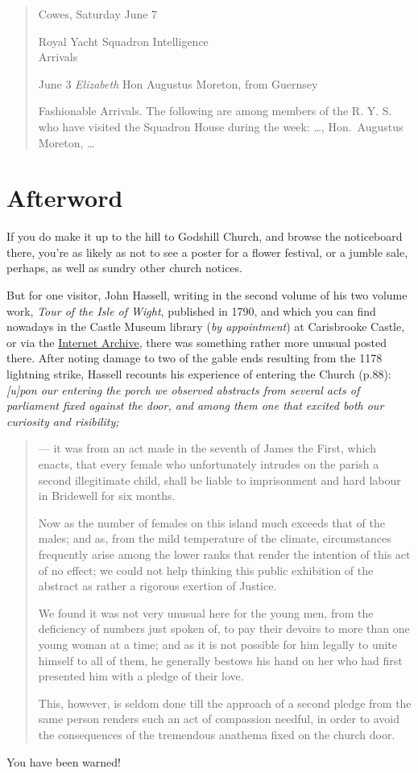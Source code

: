 \documentclass[
  12pt,
  a5paper,
  twoside]{book}
\begin{document}
\begin{quote}
Cowes, Saturday June 7

Royal Yacht Squadron Intelligence\\
Arrivals

June 3 \emph{Elizabeth} Hon Augustus Moreton, from Guernsey

Fashionable Arrivals. The following are among members of the R. Y. S.
who have visited the Squadron House during the week: \ldots,
Hon.~Augustus Moreton, \ldots{}
\end{quote}


\chapter{Afterword}\label{afterword}

If you do make it up to the hill to Godshill Church, and browse the
noticeboard there, you're as likely as not to see a poster for a flower
festival, or a jumble sale, perhaps, as well as sundry other church
notices.

But for one visitor, John Hassell, writing in the second volume of his
two volume work, \emph{Tour of the Isle of Wight}, published in 1790,
and which you can find nowadays in the Castle Museum library (\emph{by
appointment}) at Carisbrooke Castle, or via the
\href{https://archive.org/details/bim_eighteenth-century_tour-of-the-isle-of-wigh_hassell-j_1790_2/page/n121/mode/2up?}{Internet
Archive}, there was something rather more unusual posted there. After
noting damage to two of the gable ends resulting from the 1178 lightning
strike, Hassell recounts his experience of entering the Church (p.88):
\emph{{[}u{]}pon our entering the porch we observed abstracts from
several acts of parliament fixed against the door, and among them one
that excited both our curiosity and risibility;}

\begin{quote}
--- it was from an act made in the seventh of James the First, which
enacts, that every female who unfortunately intrudes on the parish a
second illegitimate child, shall be liable to imprisonment and hard
labour in Bridewell for six months.

Now as the number of females on this island much exceeds that of the
males; and as, from the mild temperature of the climate, circumstances
frequently arise among the lower ranks that render the intention of this
act of no effect; we could not help thinking this public exhibition of
the abstract as rather a rigorous exertion of Justice.

We found it was not very unusual here for the young men, from the
deficiency of numbers just spoken of, to pay their devoirs to more than
one young woman at a time; and as it is not possible for him legally to
unite himself to all of them, he generally bestows his hand on her who
had first presented him with a pledge of their love.

This, however, is seldom done till the approach of a second pledge from
the same person renders such an act of compassion needful, in order to
avoid the consequences of the tremendous anathema fixed on the church
door.
\end{quote}

You have been warned!


\backmatter
\end{document}

